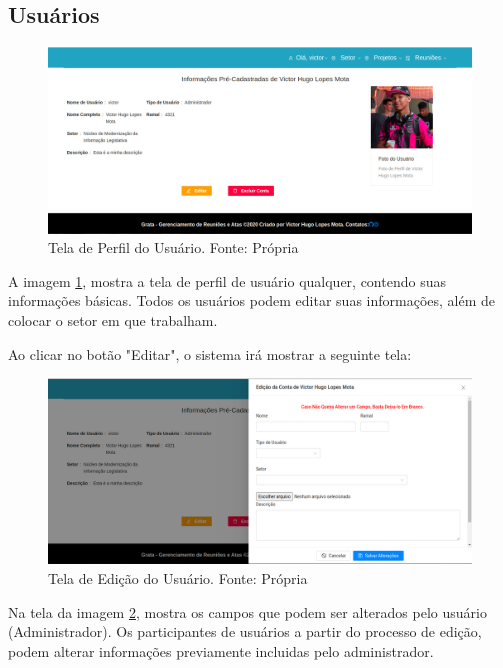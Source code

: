 \subsection{Usuários}

\begin{figure}[H]
    \centering
    \includegraphics[width=1.0\textwidth]{figuras/tela_perfil.png}
    \caption{Tela de Perfil do Usuário. Fonte: Própria}
    \label{img:tela_perfil_usuario}
\end{figure}

A imagem \ref{img:tela_perfil_usuario}, mostra a tela de perfil de usuário qualquer, contendo suas informações básicas. Todos os usuários podem editar suas informações, além de colocar o setor em que trabalham.

Ao clicar no botão "Editar", o sistema irá mostrar a seguinte tela:

\begin{figure}[H]
    \centering
    \includegraphics[width=1.0\textwidth]{figuras/edicao_usuario.png}
    \caption{Tela de Edição do Usuário. Fonte: Própria}
    \label{img:tela_edicao_usuario}
\end{figure}

Na tela da imagem \ref{img:tela_edicao_usuario}, mostra os campos que podem ser alterados pelo usuário (Administrador). Os participantes de usuários a partir do processo de edição, podem alterar informações previamente incluidas pelo administrador.

